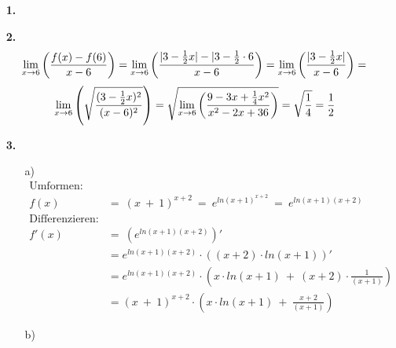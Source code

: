 \documentclass[a4paper,11pt]{article}
\title{\titleinfo}
\author{\authorinfotitle}
\date{\today}
\begin{document}
\maketitle
    \begin{enumerate}
        \item[\textbf{1.}]
            \todo
              
        \item[\textbf{2.}]
        	\[
            \lim\limits_{x \rightarrow 6}\left(\frac{f(x) - f(6)}{x-6}\right) =
            \lim\limits_{x \rightarrow 6}\left(\frac{|3 - \frac{1}{2}x| - |3 - \frac{1}{2} \cdot 6}{x-6}\right) =
            \lim\limits_{x \rightarrow 6}\left(\frac{|3 - \frac{1}{2}x|}{x-6}\right) =
            \]
            \[
            \lim\limits_{x \rightarrow 6}\left(\sqrt{\frac{(3 - \frac{1}{2}x)^2}{(x-6)^2}}\right) =
            \sqrt{\lim\limits_{x \rightarrow 6}\left(\frac{9 - 3x + \frac{1}{4}x^2}{x^2 - 2x + 36}\right)} =
            \sqrt{\frac{1}{4}} = \frac{1}{2}
            \]

        \begin{center}\end{center}
        \item[\textbf{3.}]
            \begin{enumerate}
            \item[{a)}]
                    \begin{align*}
                    \text{Umformen:}& \\
                    f(x) \ &= \ (x\ +\ 1)^{x+2} \ = \ e^{ln(x+1)^{x+2}} \ = \  e^{ln(x+1)(x+2)} \\
                    \text{Differenzieren:}& \\
                    f'(x) \ &= \  \left(e^{ln(x+1)(x+2)} \right)'  \\
                    &=  e^{ln(x+1)(x+2)} \cdot \left((x+2) \cdot ln(x+1)\right)'  \\
                    &= e^{ln(x+1)(x+2)} \cdot \left(x \cdot ln(x+1) \ +\ (x+2)\cdot \frac{1}{(x+1)}\right) \\
                    &= (x\ +\ 1)^{x+2} \cdot \left(x \cdot ln(x+1) \ +\ \frac{x+2}{(x+1)}\right) 
                    \end{align*}
             \item[{b)}]
                    \begin{enumerate}


\end{enumerate}
\end{enumerate}
\end{enumerate}
\end{document}
